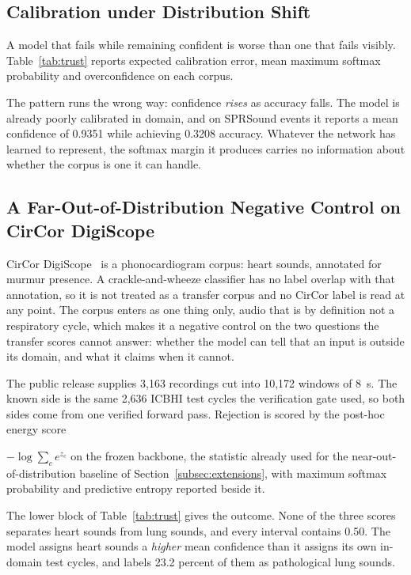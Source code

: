 \documentclass[journal,onecolumn]{IEEEtran}
\newif\ifshownew
\newcommand{\added}[1]{\ifshownew\ul{#1}\else#1\fi}
\newenvironment{addedblock}{}{}
\begin{document}
\begin{addedblock}
\subsection{Calibration under Distribution Shift}
\label{subsec:calibration}

\added{%
A model that fails while remaining confident is worse than one that fails visibly.
Table~\mbox{\ref{tab:trust}} reports expected calibration error, mean maximum softmax probability
and overconfidence on each corpus.%
}

\added{%
The pattern runs the wrong way: confidence \emph{rises} as accuracy falls. The model is already
poorly calibrated in domain, and on SPRSound events it reports a mean confidence of 0.9351
while achieving 0.3208 accuracy. Whatever the network has learned to represent, the softmax
margin it produces carries no information about whether the corpus is one it can handle.%
}

\subsection{A Far-Out-of-Distribution Negative Control on CirCor DigiScope}
\label{subsec:negcontrol}

\added{%
CirCor DigiScope~\mbox{\cite{oliveira2022circor}} is a phonocardiogram corpus: heart sounds, annotated
for murmur presence. A crackle-and-wheeze classifier has no label overlap with that annotation,
so it is not treated as a transfer corpus and no CirCor label is read at any point. The corpus
enters as one thing only, audio that is by definition not a respiratory cycle, which makes it a
negative control on the two questions the transfer scores cannot answer: whether the model can
tell that an input is outside its domain, and what it claims when it cannot.%
}

\added{%
The public release supplies 3,163 recordings cut into 10,172 windows of 8~s. The known side is
the same 2,636 ICBHI test cycles the verification gate used, so both sides come from one
verified forward pass. Rejection is scored by the post-hoc energy score%
}
$-\log\sum_c e^{z_c}$
\added{%
on the frozen backbone, the statistic already used for the near-out-of-distribution baseline of
Section~\mbox{\ref{subsec:extensions}}, with maximum softmax probability and predictive entropy
reported beside it.%
}

\added{%
The lower block of Table~\mbox{\ref{tab:trust}} gives the outcome. None of the three scores separates
heart sounds from lung sounds, and every interval contains 0.50. The model assigns heart sounds
a \emph{higher} mean confidence than it assigns its own in-domain test cycles, and labels 23.2
percent of them as pathological lung sounds.%
}


\end{addedblock}
\end{document}
